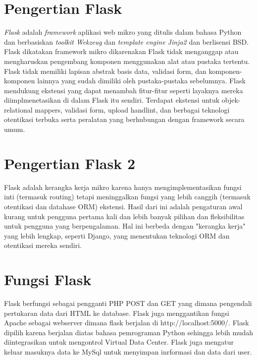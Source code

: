 
\section{Pengertian Flask}
\emph{Flask} adalah \emph{framework} aplikasi web mikro yang ditulis dalam bahasa Python dan berbasiskan \emph{toolkit Wekzeug} dan \emph{template engine Jinja2} dan berlisensi BSD. Flask dikatakan framework mikro dikarenakan Flask tidak menganggap atau mengharuskan pengembang komponen menggunakan alat atau pustaka tertentu. Flask tidak memiliki lapisan abstrak basis data, validasi form, dan komponen-komponen lainnya yang sudah dimiliki oleh pustaka-pustaka sebelumnya. Flask mendukung ekstensi yang dapat menambah fitur-fitur seperti layaknya mereka diimplmenetasikan di dalam Flask itu sendiri. Terdapat ekstensi untuk objek-relational mappers, validasi form, upload handlint, dan berbagai teknologi otentikasi terbuka serta peralatan yang berhubungan dengan framework secara umum\cite{solihin2016implementasi}.

\section{Pengertian Flask 2}
Flask adalah kerangka kerja mikro karena hanya mengimplementasikan fungsi inti (termasuk routing) tetapi meninggalkan fungsi yang lebih canggih (termasuk otentikasi dan datahase ORM) ekstensi. Hasil dari ini adalah pengaturan awal kurang untuk pengguna pertama kali dan lebih banyak pilihan dan fleksibilitas untuk pengguna yang berpengalaman. Hal ini berbeda dengan "kerangka kerja" yang lebih lengkap, seperti Django, yang menentukan teknologi ORM dan otentikasi mereka sendiri\cite{dwyer2016flask}.

\section{Fungsi Flask}
Flask berfungsi sebagai pengganti PHP POST dan GET yang dimana pengendali pertukaran data dari HTML ke database. Flask juga menggantikan fungsi Apache sebagai webserver dimana flask berjalan di http://localhost:5000/.
Flask dipilih karena berjalan diatas bahasa pemrograman Python sehingga lebih mudah diintegrasikan untuk mengontrol Virtual Data Center. Flask juga mengatur keluar masuknya data ke MySql untuk menyimpan inrformasi dan data dari user\cite{alauddin2017implementasi}.

